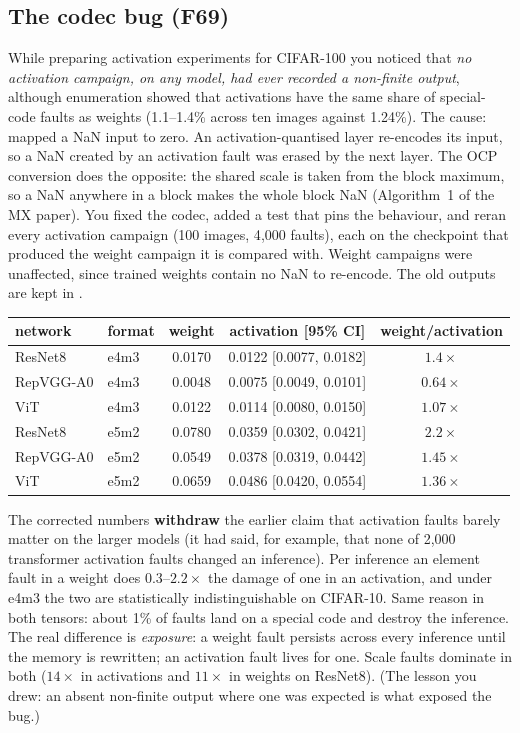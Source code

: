 \subsection{The codec bug (F69)}
While preparing activation experiments for CIFAR-100 you noticed that \emph{no activation campaign, on any model, had ever recorded a non-finite output}, although enumeration showed that activations have the same share of special-code faults as weights (1.1--1.4\% across ten images against 1.24\%). The cause:  mapped a NaN input to zero. An activation-quantised layer re-encodes its input,
so a NaN created by an activation fault was erased by the next layer. The OCP conversion does the opposite: the shared scale is taken from the block maximum, so a NaN anywhere in a block makes the whole block NaN (Algorithm~1 of the MX paper). You fixed the codec, added a test that pins the behaviour, and reran every activation campaign (100 images, 4{,}000 faults), each on the checkpoint that produced the weight campaign it is compared with.
Weight campaigns were unaffected, since trained weights contain no NaN to re-encode. The old outputs are kept in .

\begin{center}
\small
\begin{tabular}{llccc}
\toprule
network & format & weight & activation [95\% CI] & weight/activation \\
\midrule
ResNet8 & e4m3 & 0.0170 & 0.0122 [0.0077, 0.0182] & $1.4\times$ \\
RepVGG-A0 & e4m3 & 0.0048 & 0.0075 [0.0049, 0.0101] & $0.64\times$ \\
ViT & e4m3 & 0.0122 & 0.0114 [0.0080, 0.0150] & $1.07\times$ \\
ResNet8 & e5m2 & 0.0780 & 0.0359 [0.0302, 0.0421] & $2.2\times$ \\
RepVGG-A0 & e5m2 & 0.0549 & 0.0378 [0.0319, 0.0442] & $1.45\times$ \\
ViT & e5m2 & 0.0659 & 0.0486 [0.0420, 0.0554] & $1.36\times$ \\
\bottomrule
\end{tabular}
\end{center}
The corrected numbers \textbf{withdraw} the earlier claim that activation faults barely matter on the larger models (it had said, for example, that none of 2{,}000 transformer activation faults changed an inference). Per inference an element fault in a weight does $0.3$--$2.2\times$ the damage of one in an activation, and under e4m3 the two are statistically indistinguishable on CIFAR-10.
Same reason in both tensors: about 1\% of faults land on a special code and destroy the inference. The real difference is \emph{exposure}: a weight fault persists across every inference until the memory is rewritten; an activation fault lives for one. Scale faults dominate in both ($14\times$ in activations and $11\times$ in weights on ResNet8).
(The lesson you drew: an absent non-finite output where one was expected is what exposed the bug.)

